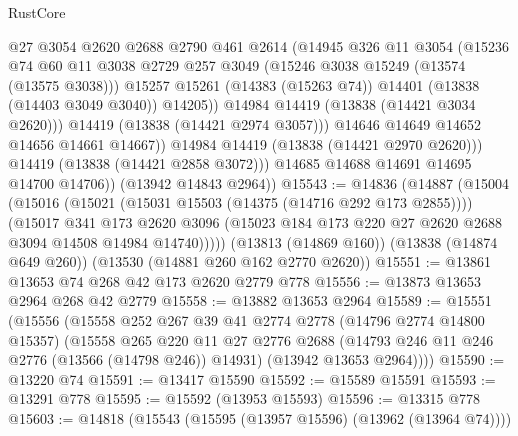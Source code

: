 \begin{lexlean}{RustCore}
\begin{coremodule}
                      @27
                      @3054
                      @2620
                      @2688
                      @2790
                      @461
                      @2614
                      (@14945
                        @326
                        @11
                        @3054
                        (@15236
                          @74
                          @60
                          @11
                          @3038
                          @2729
                          @257
                          @3049
                          (@15246 @3038 @15249 (@13574 (@13575 @3038)))
                          @15257
                          @15261
                          (@14383 (@15263 @74))
                          @14401
                          (@13838 (@14403 @3049 @3040))
                          @14205))
                      @14984
                      @14419
                      (@13838 (@14421 @3034 @2620)))
                    @14419
                    (@13838 (@14421 @2974 @3057)))
                  @14646
                  @14649
                  @14652
                  @14656
                  @14661
                  @14667))
              @14984
              @14419
              (@13838 (@14421 @2970 @2620)))
            @14419
            (@13838 (@14421 @2858 @3072)))
          @14685
          @14688
          @14691
          @14695
          @14700
          @14706))
      (@13942 @14843 @2964))
@15543 := @14836
    (@14887
      (@15004
        (@15016
          (@15021 (@15031 @15503 (@14375 (@14716 @292 @173 @2855))))
          (@15017
            @341
            @173
            @2620
            @3096
            (@15023 @184 @173 @220 @27 @2620 @2688 @3094 @14508 @14984 @14740)))))
    (@13813 (@14869 @160))
    (@13838 (@14874 @649 @260))
    (@13530 (@14881 @260 @162 @2770 @2620))
@15551 := @13861 @13653 @74 @268 @42 @173 @2620 @2779 @778
@15556 := @13873 @13653 @2964 @268 @42 @2779
@15558 := @13882 @13653 @2964
@15589 := @15551
    (@15556
      (@15558
        @252
        @267
        @39
        @41
        @2774
        @2778
        (@14796 @2774 @14800 @15357)
        (@15558
          @265
          @220
          @11
          @27
          @2776
          @2688
          (@14793 @246 @11 @246 @2776 (@13566 (@14798 @246)) @14931)
          (@13942 @13653 @2964))))
@15590 := @13220 @74
@15591 := @13417 @15590
@15592 := @15589 @15591
@15593 := @13291 @778
@15595 := @15592 (@13953 @15593)
@15596 := @13315 @778
@15603 := @14818 (@15543 (@15595 (@13957 @15596) (@13962 (@13964 @74))))

\end{coremodule}
\end{lexlean}
